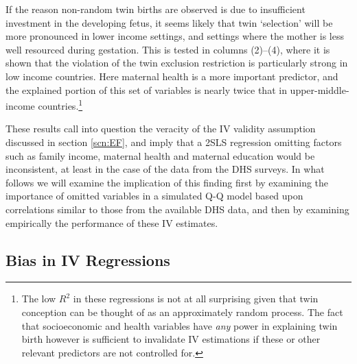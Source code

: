 \documentclass{article}[11pt,subeqn]
\begin{document}
\begin{spacing}{1.5}
If the reason non-random twin births are observed is due to insufficient investment in the developing fetus, it seems likely that twin `selection' will be more 
pronounced in lower income settings, and settings where the mother is less well resourced during gestation.  This is tested in columns (2)--(4), where it is 
shown that the violation of the twin exclusion restriction is particularly strong in low income countries.  Here maternal health is a more important predictor, 
and the explained portion of this set of variables is nearly twice that in upper-middle-income countries.\footnote{The low $R^2$ in these regressions is not at 
all surprising given that twin conception can be thought of as an approximately random process.  The fact that socioeconomic and health variables have \emph{any} 
power in explaining twin birth however is sufficient to invalidate IV estimations if these or other relevant predictors are not controlled for.}

These results call into question the veracity of the IV validity assumption discussed in section \ref{scn:EF}, and imply that a 2SLS regression 
omitting factors such as family income, maternal health and maternal education would be inconsistent, at least in the case of the data from the 
DHS surveys.  In what follows we will examine the implication of this finding first by examining the importance of omitted variables in a simulated 
Q-Q model based upon correlations similar to those from the available DHS data, and then by examining empirically the performance of these IV estimates.  
\subsection{Bias in IV Regressions}
\label{scn:bias}

\end{spacing}
\end{document}
